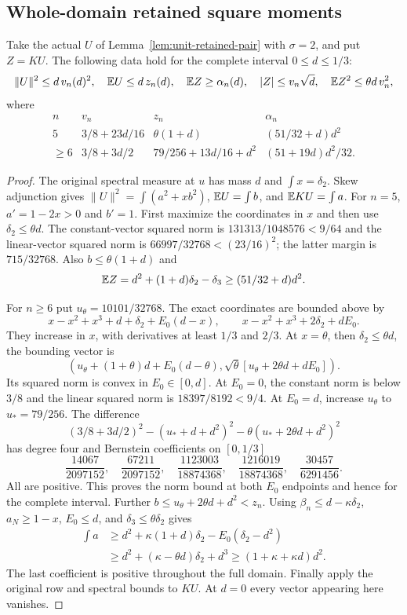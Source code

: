 \subsection{Whole-domain retained square moments}
\label{sec:unit-retained-whole-moments}
\begin{lemma}[Whole-domain data for $\sigma=2$]
\label{lem:unit-retained:whole-data}
Take the actual $U$ of Lemma~\ref{lem:unit-retained-pair} with
$\sigma=2$, and put $Z=KU$. The following data hold for the
complete interval $0\le d\le1/3$:
\[
 \|U\|^2\le d\,v_n(d)^2,\quad
 \mathbb E U\le d\,z_n(d),\quad \mathbb E Z\ge\alpha_n(d),\quad
 |Z|\le v_n\sqrt d,\quad \mathbb E Z^2\le\theta d\,v_n^2,
\]
where
\[
 \begin{array}{c|ccc}
 n&v_n&z_n&\alpha_n\\ \hline
 5&3/8+23d/16&\theta(1+d)&(51/32+d)d^2\\
 \ge6&3/8+3d/2&79/256+13d/16+d^2&(51+19d)d^2/32.
 \end{array}
\]
\end{lemma}
\begin{proof}
The original spectral measure at $u$ has mass $d$ and
$\int x=\delta_2$. Skew adjunction gives
$\|U\|^2=\int(a^2+xb^2)$, $\mathbb E U=\int b$,
and $\mathbb E KU=\int a$.
For $n=5$, $a'=1-2x>0$ and $b'=1$. First maximize the coordinates in $x$ and
then use $\delta_2\le\theta d$. The constant-vector squared norm
is $131313/1048576<9/64$ and the linear-vector squared norm is
$66997/32768<(23/16)^2$; the latter margin is $715/32768$.
Also $b\le\theta(1+d)$ and
\[
 \mathbb E Z=d^2+(1+d)\delta_2-\delta_3
       \ge(51/32+d)d^2.
\]

For $n\ge6$ put $u_\theta=10101/32768$.
The exact coordinates are bounded above by
\[
 x-x^2+x^3+d+\delta_2+E_0(d-x),\qquad
 x-x^2+x^3+2\delta_2+dE_0.
\]
They increase in $x$, with derivatives at least $1/3$ and $2/3$.
At $x=\theta$, then $\delta_2\le\theta d$, the bounding vector is
\[
 (u_\theta+(1+\theta)d+E_0(d-\theta),
   \sqrt\theta[u_\theta+2\theta d+dE_0]).
\]
Its squared norm is convex in $E_0\in[0,d]$.
At $E_0=0$, the constant norm is below $3/8$ and the linear
squared norm is $18397/8192<9/4$. At $E_0=d$, increase
$u_\theta$ to $u_*=79/256$.
The difference
\[
 (3/8+3d/2)^2-(u_*+d+d^2)^2
                  -\theta(u_*+2\theta d+d^2)^2
\]
has degree four and Bernstein coefficients on $[0,1/3]$
\[
 \frac{14067}{2097152},\quad\frac{67211}{2097152},\quad
 \frac{1123003}{18874368},\quad\frac{1216019}{18874368},\quad
 \frac{30457}{6291456}.
\]
All are positive. This proves the norm bound at both $E_0$
endpoints and hence for the complete interval.
Further $b\le u_\theta+2\theta d+d^2<z_n$.
Using $\beta_n\le d-\kappa\delta_2$, $a_N\ge1-x$,
$E_0\le d$, and $\delta_3\le\theta\delta_2$ gives
\[
 \begin{split}
 \int a&\ge d^2+\kappa(1+d)\delta_2-E_0(\delta_2-d^2)\\
        &\ge d^2+(\kappa-\theta d)\delta_2+d^3
         \ge(1+\kappa+\kappa d)d^2.
 \end{split}
\]
The last coefficient is positive throughout the full domain.
Finally apply the original row and spectral bounds to $KU$.
At $d=0$ every vector appearing here vanishes.
\end{proof}

